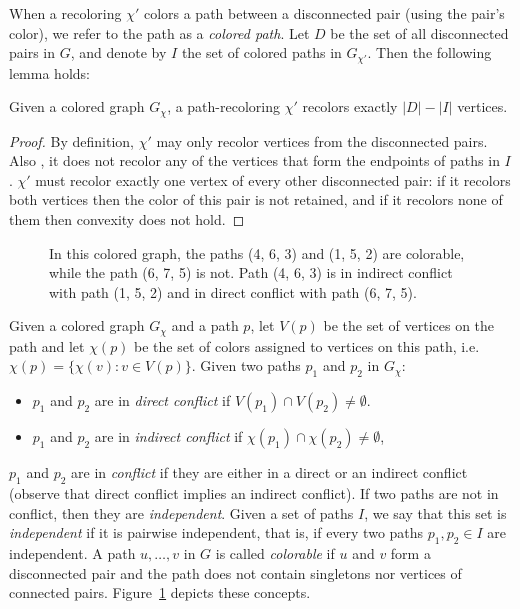 When a recoloring $\chi'$ colors a path between a disconnected pair (using the pair's color), 
we refer to the path as a \emph{colored path}.
%
Let $D$ be the set of all disconnected pairs in $G$, 
and denote by $I$ the set of colored paths in $G_{\chi'}$. 
Then the following lemma holds:

\begin{lemma}
\label{lm:cost}
Given a colored graph $G_\chi$, 
a path-recoloring $\chi'$ recolors exactly $|D| - |I|$ vertices.
\end{lemma}

\begin{proof}
By definition,
$\chi'$ may only recolor vertices from the disconnected pairs.
Also , it does not recolor any of the vertices that form the endpoints of paths in $I$.
%
$\chi'$ must recolor exactly one vertex of every other disconnected pair:
if it recolors both vertices then the color of this pair is not retained,
and if it recolors none of them then convexity does not hold.
\end{proof}

\begin{figure}
\centering

\caption{
\label{fig:paths}
In this colored graph, the paths (4, 6, 3) and (1, 5, 2) are colorable, while
the path (6, 7, 5) is not.
Path (4, 6, 3) is in indirect conflict with path (1, 5, 2) and in direct
conflict with path (6, 7, 5).
}
\end{figure}
Given a colored graph $G_\chi$ and a path $p$, 
let $V(p)$ be the set of vertices on the path and let $\chi(p)$ 
be the set of colors assigned to vertices on this path, 
i.e. $\chi(p) = {\{\chi(v) : v \in V(p)\}}$.
%
Given two paths $p_1$ and $p_2$ in $G_\chi$:
\begin{itemize}
\item 
$p_1$ and $p_2$ are in \emph{direct conflict} if $V(p_1) \cap V(p_2) \neq \emptyset$.

\item 
$p_1$ and $p_2$ are in \emph{indirect conflict} if $\chi(p_1) \cap \chi(p_2) \neq \emptyset$,
\end{itemize}
%
$p_1$ and $p_2$ are in \emph{conflict} if they are either in a direct
or an indirect conflict 
(observe that direct conflict implies an indirect conflict).
%
If two paths are not in conflict, 
then they are \emph{independent}.
%
Given a set of paths $I$, 
we say that this set is \emph{independent}
if it is pairwise independent, 
that is, 
if every two paths $p_1, p_2 \in I$ are independent.
%
A path $u, \dots, v$ in $G$ is called \emph{colorable} if $u$ and $v$
form a disconnected pair and the path does not contain singletons nor
vertices of connected pairs.
%
Figure~\ref{fig:paths} depicts these concepts.

